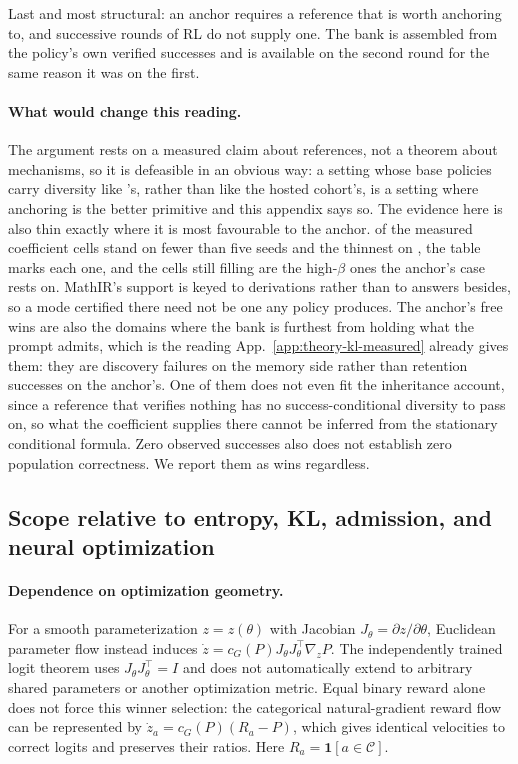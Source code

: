 \documentclass{article}
\newcommand{\1}{\mathbf 1}
\theoremstyle{remark}
\theoremstyle{definition}
\theoremstyle{plain}
\begin{document}
Last and most structural: an anchor requires a reference that is worth
anchoring to, and successive rounds of RL do not supply one. The bank is
assembled from the policy's own verified successes and is available on the
second round for the same reason it was on the first.

\paragraph{What would change this reading.}
The argument rests on a measured claim about references, not a theorem about
mechanisms, so it is defeasible in an obvious way: a setting whose base
policies carry diversity like \MDklWinDomain{}'s, rather than like the hosted
cohort's, is a setting where anchoring is the better primitive and this
appendix says so.
The evidence here is also thin exactly where it is most favourable to the
anchor. \MDklThinCells{} of the \MDklTotalCells{} measured coefficient cells
stand on fewer than five seeds and the thinnest on \MDklSeedsMin{}, the table
marks each one, and the cells still filling are the high-$\beta$ ones the
anchor's case rests on. MathIR's support is keyed to derivations rather than to
answers besides, so a mode certified there need not be one any policy produces.
The anchor's free wins are also the domains where the bank is furthest from
holding what the prompt admits, which is the reading
App.~\ref{app:theory-kl-measured} already gives them: they are discovery
failures on the memory side rather than retention successes on the anchor's.
One of them does not even fit the inheritance account, since a reference that
verifies nothing has no success-conditional diversity to pass on, so what the
coefficient supplies there cannot be inferred from the stationary
conditional formula. Zero observed successes also does not establish
zero population correctness. We report them as wins regardless.

\subsection{Scope relative to entropy, KL, admission, and neural optimization}
\label{app:theory-entropy}
\label{app:theory-entropy-comparison}

\paragraph{Dependence on optimization geometry.}
For a smooth parameterization $z=z(\theta)$ with Jacobian
$J_\theta=\partial z/\partial\theta$, Euclidean parameter flow instead
induces $\dot z=c_G(P)J_\theta J_\theta^\top\nabla_zP$. The independently
trained logit theorem uses $J_\theta J_\theta^\top=I$ and does not automatically
extend to arbitrary shared parameters or another optimization metric. Equal
binary reward alone does not force this winner selection: the categorical
natural-gradient reward flow can be represented by
$\dot z_a=c_G(P)(R_a-P)$, which gives identical velocities to correct logits
and preserves their ratios. Here $R_a=\1[a\in\mathcal C]$.
\end{document}
